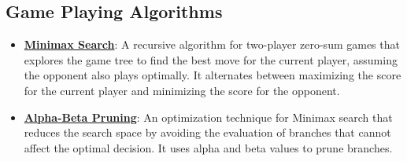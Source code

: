 \documentclass{article}%
\begin{document}
\subsection{Game Playing Algorithms}%
\label{subsec:GamePlayingAlgorithms}%
\begin{itemize}[leftmargin=*]%
\item \href{https://purdue.brightspace.com/d2l/common/assets/pdfjs-d2l-dist/1.0.14-legacy/web/viewer.html?file=%2Fcontent%2Fenforced%2F1095467-wl.202510.CS.24300.001%2F02L2-Intro.pdf%3Fou%3D1095467&lang=en-us&container=d2l-fileviewer-rendered-pdf&fullscreen=d2l-fileviewer-rendered-pdf-dialog&height=667#page=22}{\textbf{Minimax Search}}: A recursive algorithm for two-player zero-sum games that explores the game tree to find the best move for the current player, assuming the opponent also plays optimally. It alternates between maximizing the score for the current player and minimizing the score for the opponent.%
\item \href{https://purdue.brightspace.com/d2l/common/assets/pdfjs-d2l-dist/1.0.14-legacy/web/viewer.html?file=%2Fcontent%2Fenforced%2F1095467-wl.202510.CS.24300.001%2F02L2-Intro.pdf%3Fou%3D1095467&lang=en-us&container=d2l-fileviewer-rendered-pdf&fullscreen=d2l-fileviewer-rendered-pdf-dialog&height=667#page=23}{\textbf{Alpha-Beta Pruning}}: An optimization technique for Minimax search that reduces the search space by avoiding the evaluation of branches that cannot affect the optimal decision. It uses alpha and beta values to prune branches.%
\end{itemize}

%
\end{document}
